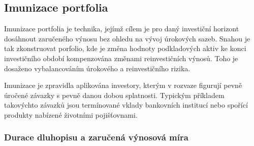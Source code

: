 \documentclass[a4paper]{book}
\begin{document}
\subsection{Imunizace portfolia}

Imunizace portfolia je technika, jejímž cílem je pro daný investiční horizont dosáhnout zaručeného výnosu bez ohledu na vývoj úrokových sazeb. Snahou je tak zkonstruovat porfolio, kde je změna hodnoty podkladových aktiv ke konci investičního období kompenzována změnami reinvestičních výnosů. Toho je dosaženo vybalancováním úrokového a reinvestičního rizika.

Imunizace je zpravidla aplikována investory, kterým v rozvaze figurují pevně úročené závazky s pevně danou dobou splatnosti. Typickým příkladem takovýchto závazků jsou termínované vklady bankovních institucí nebo spořící produkty nabízené životními pojišťovnami.

\subsubsection{Durace dluhopisu a zaručená výnosová míra}
\end{document}
